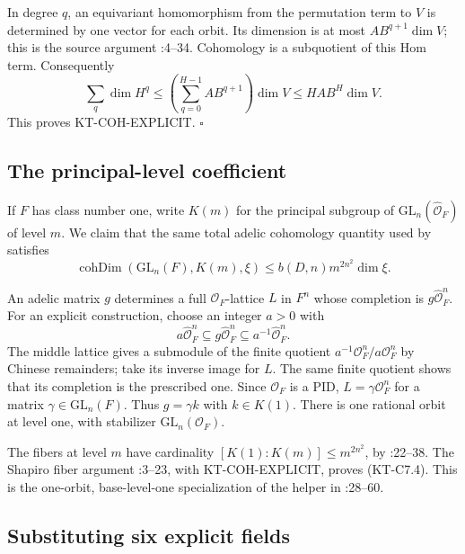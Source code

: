 \documentclass[11pt,a4paper]{article}
\theoremstyle{definition}
\begin{document}
In degree $q$, an equivariant homomorphism from the permutation term
to $V$ is determined by one vector for each orbit.  Its dimension is
at most $AB^{q+1}\dim V$; this is the source argument
:4--34.
Cohomology is a subquotient of this Hom term.  Consequently
\[
 \sum_q\dim H^q
 \le\left(\sum_{q=0}^{H-1}AB^{q+1}\right)\dim V
 \le HAB^H\dim V.
\]
This proves KT-COH-EXPLICIT. \hfill$\square$

\subsection{The principal-level coefficient}

If $F$ has class number one, write $K(m)$ for the principal subgroup
of $\mathrm{GL}_n(\widehat{\mathcal O}_F)$ of level $m$.  We claim that
the same total adelic cohomology quantity used by 
satisfies
\[
 \operatorname{cohDim}(\mathrm{GL}_n(F),K(m),\xi)
 \le b(D,n)m^{2n^2}\dim\xi.
\tag{KT-C7.4}
\]

An adelic matrix $g$ determines a full $\mathcal O_F$-lattice $L$ in
$F^n$ whose completion is $g\widehat{\mathcal O}_F^n$.
For an explicit construction, choose an integer $a>0$ with
\[
 a\widehat{\mathcal O}_F^n\subseteq
 g\widehat{\mathcal O}_F^n\subseteq
 a^{-1}\widehat{\mathcal O}_F^n.
\]
The middle lattice gives a submodule of the finite quotient
$a^{-1}\mathcal O_F^n/a\mathcal O_F^n$ by Chinese remainders; take
its inverse image for $L$.  The same finite quotient shows that its
completion is the prescribed one.  Since $\mathcal O_F$ is a PID,
$L=\gamma\mathcal O_F^n$ for a matrix $\gamma\in\mathrm{GL}_n(F)$.
Thus $g=\gamma k$ with $k\in K(1)$.
There is one rational orbit at level one, with stabilizer
$\mathrm{GL}_n(\mathcal O_F)$.

The fibers at level $m$ have cardinality
$[K(1):K(m)]\le m^{2n^2}$, by
:22--38.
The Shapiro fiber argument
:3--23,
with KT-COH-EXPLICIT, proves (KT-C7.4).
This is the one-orbit, base-level-one specialization of the helper
 in :28--60.

\subsection{Substituting six explicit fields}
\end{document}
